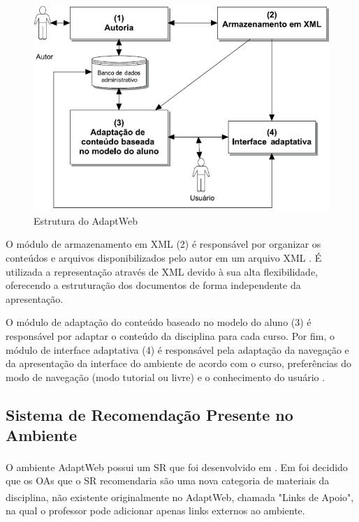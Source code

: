 \begin{figure}[htb]
  \caption{\label{fig:adaptweb-arquitetura}Estrutura do AdaptWeb\textsuperscript{\textregistered}}
  \begin{center}
      \includegraphics[scale=1.0]{./Figuras/adaptweb-arquitetura.png}
  \end{center}
\end{figure}

O módulo de armazenamento em XML (2) é responsável por organizar os conteúdos e arquivos disponibilizados pelo autor em
um arquivo XML \cite{gasparini2003interface}. É utilizada a representação através de XML devido à sua alta
flexibilidade, oferecendo a estruturação dos documentos de forma independente da apresentação.

O módulo de adaptação do conteúdo baseado no modelo do aluno (3) é responsável por adaptar o conteúdo da disciplina
para cada curso. Por fim, o módulo de interface adaptativa (4) é responsável pela adaptação da navegação e da
apresentação da interface do ambiente de acordo com o curso, preferências do modo de navegação (modo tutorial ou livre)
e o conhecimento do usuário \cite{gasparini2003interface}.

\subsection{Sistema de Recomendação Presente no Ambiente}

O ambiente AdaptWeb\textsuperscript{\textregistered} possui um SR que foi desenvolvido em . Em 
foi decidido que os OAs que o SR recomendaria são uma nova categoria de materiais da disciplina, não existente
originalmente no AdaptWeb\textsuperscript{\textregistered}, chamada "Links de Apoio", na qual o professor pode adicionar apenas links externos ao ambiente.

